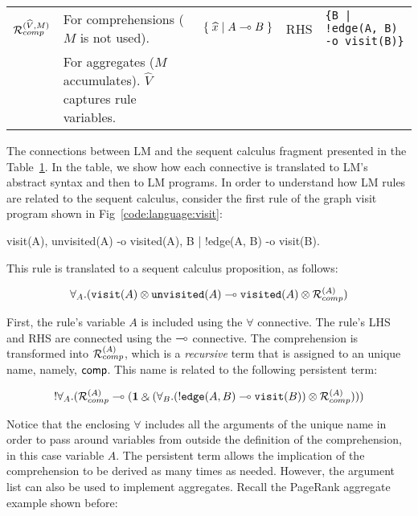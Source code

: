 \begin{table*}
\begin{center}
{\begin{tabular}{ | l | l || l | l | l |}
                                 $\mathcal{R}_{comp}^{(\widehat{V}, M)}$               & For comprehensions
    ($M$ is not used).  & $\{ \; \widehat{x} \; | \; A \multimap B \; \}$  & RHS & \texttt{\{B | !edge(A, B) -o visit(B)\}}        \\
    & For aggregates ($M$ accumulates). $\widehat{V}$ captures rule variables.          &                                               &                 &                                                \\ \hline
    \end{tabular}
}
\end{center}
\label{table:linear}
\end{table*}

The connections between LM and the sequent calculus fragment presented in the
Table~\ref{table:linear}. In the table, we show how each connective is
translated to LM's abstract syntax and then to LM programs. In order to
understand how LM rules are related to the sequent calculus, consider the first
rule of the graph visit program shown in Fig~\ref{code:language:visit}:

\begin{LineCode}[commandchars=\*\[\]]
visit(A),
unvisited(A)
   -o visited(A),
      {B | !edge(A, B) -o visit(B)}.
\end{LineCode}

This rule is translated to a sequent calculus proposition, as follows:

\begin{align}
\forall_A. (\texttt{visit}(A) \otimes \texttt{unvisited}(A) \multimap
   \texttt{visited}(A) \otimes \mathcal{R}_{comp}^{(A)})
\end{align}

First, the rule's variable $A$ is included using the $\forall$ connective. The
rule's LHS and RHS are connected using the $\multimap$ connective. The
comprehension is transformed into $\mathcal{R}_{comp}^{(A)}$, which is a
\emph{recursive} term that is assigned to an unique name, namely, $\mathsf{comp}$.
This name is related to the following persistent term:

\begin{align}
{!} \forall_A. (\mathcal{R}_{comp}^{(A)} \multimap (\mathbf{1} \mathbin{\binampersand}
         (\forall_B. ({!} \texttt{edge}(A, B) \multimap
                                             \texttt{visit}(B)) \otimes
          \mathcal{R}_{comp}^{(A)})))
\end{align}

Notice that the enclosing $\forall$ includes all the arguments of the unique
name in order to pass around variables from outside the definition of the
comprehension, in this case variable $A$. The persistent term allows the
implication of the comprehension to be derived as many times as needed.
However, the argument list can also be used to implement aggregates.  Recall the
PageRank aggregate example shown before:

